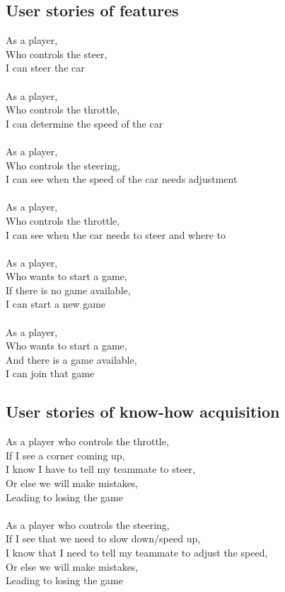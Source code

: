 \documentclass[11pt,twoside,a4paper]{article}
\begin{document}
\subsection{User stories of features}
As a player,\\
Who controls the steer,\\
I can steer the car\\
\\
As a player,\\
Who controls the throttle,\\
I can determine the speed of the car\\
\\
As a player,\\
Who controls the steering,\\
I can see when the speed of the car needs adjustment\\
\\
As a player,\\
Who controls the throttle,\\
I can see when the car needs to steer and where to\\
\\
As a player,\\
Who wants to start a game,\\
If there is no game available,\\
I can start a new game\\
\\
As a player,\\
Who wants to start a game,\\
And there is a game available,\\
I can join that game\\
\subsection{User stories of know-how acquisition}
As a player who controls the throttle,\\
If I see a corner coming up,\\
I know I have to tell my teammate to steer,\\
Or else we will make mistakes,\\
Leading to losing the game\\
\\
As a player who controls the steering,\\
If I see that we need to slow down/speed up,\\
I know that I need to tell my teammate to adjust the speed,\\
Or else we will make mistakes,\\
Leading to losing the game\\
\end{document}
